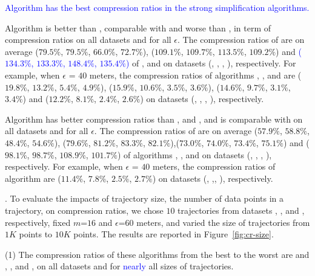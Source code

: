  \textcolor{blue}{Algorithm \cisto has the best compression ratios in the strong simplification algorithms.}

 Algorithm \cist is better than \squishe, {comparable} with \dps and worse than \cisto, in term of compression ratios on all datasets and for all $\epsilon$.
The compression ratios of \cist are on average {($79.5\%$, $79.5\%$, $66.0\%$,
$72.7\%$), ($109.1\%$, $109.7\%$, $113.5\%$, $109.2\%$)} and \textcolor{blue}{($134.3\%$, $133.3\%$, $148.4\%$, $135.4\%$)} of \squishe,
\dps and \cisto on {datasets (\sercar, \geolife, \mopsi, \pricar)}, respectively.
For example, when $\epsilon$ = $40$ meters, the compression ratios of algorithms
\squishe, \cist, \dps and \cisto are 
{($19.8\%$, $13.2\%$, $5.4\%$, $4.9\%$), ($15.9\%$,
$10.6\%$, $3.5\%$, $3.6\%$), ($14.6\%$, $9.7\%$, $3.1\%$, $3.4\%$)} and {($12.2\%$, $8.1\%$, $2.4\%$, $2.6\%$)}
 on  {datasets (\sercar, \geolife, \mopsi, \pricar)}, respectively.

 Algorithm \cista has better compression ratios than \dpa, \squishe and \cist, and is comparable with \cisto on all datasets and for all $\epsilon$.
The compression ratios of \cista are on average ($57.9\%$, $58.8\%$, $48.4\%$,
$54.6\%$), ($79.6\%$, $81.2\%$, $83.3\%$, $82.1\%$),{($73.0\%$,
  $74.0\%$, $73.4\%$, $75.1\%$) and ($98.1\%$,
  $98.7\%$, $108.9\%$, $101.7\%$)} of algorithms
\squishe, \dps, \cist and \cisto on {datasets (\sercar, \geolife, \mopsi, \pricar)}, respectively.
For example, when $\epsilon$ = $40$ meters, the compression ratios of algorithm
\cista are ($11.4\%$, $7.8\%$, $2.5\%$, $2.7\%$) on datasets (\sercar, \geolife,\mopsi, \pricar), respectively.



.
To evaluate the impacts of trajectory size, \ie the number of data points in a trajectory, on compression ratios,
we chose {$10$} trajectories from {datasets \sercar, \geolife, \mopsi and \pricar}, respectively,
fixed {$m$=$16$} and $\epsilon$=$60$ meters, and varied the size  of trajectories from $1K$ points to $10K$ points.
%
The results are reported in Figure~\ref{fig:cr-size}.

\ni(1) The compression ratios of these algorithms from the best to the worst are \cista and \cisto, \dps, \cist and \squishe, on all datasets and for \textcolor{blue}{nearly} all sizes of trajectories. %

